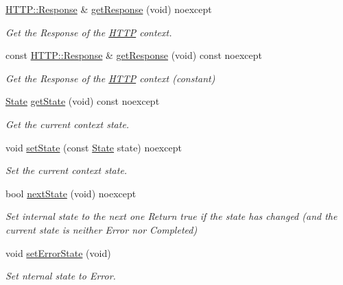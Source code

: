 \begin{DoxyCompactItemize}
\mbox{\hyperlink{classo_z_1_1_h_t_t_p_1_1_response}{H\+T\+T\+P\+::\+Response}} \& \mbox{\hyperlink{classo_z_1_1_context_ab656757ce56d11f39814747f1efe1f86}{get\+Response}} (void) noexcept
\begin{DoxyCompactList}\small\item\em Get the Response of the \mbox{\hyperlink{namespaceo_z_1_1_h_t_t_p}{H\+T\+TP}} context. \end{DoxyCompactList}\item 
const \mbox{\hyperlink{classo_z_1_1_h_t_t_p_1_1_response}{H\+T\+T\+P\+::\+Response}} \& \mbox{\hyperlink{classo_z_1_1_context_aad384e516919b9c4faf5b702b85994af}{get\+Response}} (void) const noexcept
\begin{DoxyCompactList}\small\item\em Get the Response of the \mbox{\hyperlink{namespaceo_z_1_1_h_t_t_p}{H\+T\+TP}} context (constant) \end{DoxyCompactList}\item 
\mbox{\hyperlink{namespaceo_z_a356b278f7c65def0cae75fca8cae268e}{State}} \mbox{\hyperlink{classo_z_1_1_context_af912acc5fa475aa1e835a71df1752ef5}{get\+State}} (void) const noexcept
\begin{DoxyCompactList}\small\item\em Get the current context\textquotesingle{} state. \end{DoxyCompactList}\item 
void \mbox{\hyperlink{classo_z_1_1_context_aa71b839188393f2328ad9f9c5da08004}{set\+State}} (const \mbox{\hyperlink{namespaceo_z_a356b278f7c65def0cae75fca8cae268e}{State}} state) noexcept
\begin{DoxyCompactList}\small\item\em Set the current context\textquotesingle{} state. \end{DoxyCompactList}\item 
bool \mbox{\hyperlink{classo_z_1_1_context_aa07d51de7059b3a4fc9e3505704a33be}{next\+State}} (void) noexcept
\begin{DoxyCompactList}\small\item\em Set internal state to the next one Return true if the state has changed (and the current state is neither Error nor Completed) \end{DoxyCompactList}\item 
void \mbox{\hyperlink{classo_z_1_1_context_a036d993634650ee8414c2f12d49d0204}{set\+Error\+State}} (void)
\begin{DoxyCompactList}\small\item\em Set nternal state to Error. \end{DoxyCompactList}\item 

\end{DoxyCompactItemize}
